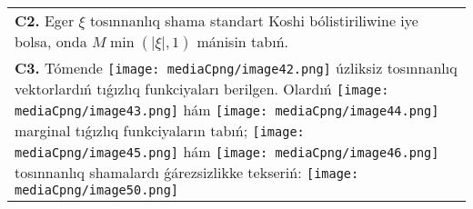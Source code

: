 \documentclass{article}
\begin{document}
\begin{tabular}{m{17cm}}
 \\
\textbf{C2.} Eger \(\xi\) tosınnanlıq shama standart Koshi bólistiriliwine iye bolsa, onda \(M\min\left( |\xi|,1 \right)\) mánisin tabıń.
 \\
\textbf{C3.} Tómende \texttt{[image: mediaCpng/image42.png]} úzliksiz tosınnanlıq vektorlardıń tıǵızlıq funkciyaları berilgen. Olardıń \texttt{[image: mediaCpng/image43.png]} hám \texttt{[image: mediaCpng/image44.png]} marginal tıǵızlıq funkciyaların tabıń; \texttt{[image: mediaCpng/image45.png]} hám \texttt{[image: mediaCpng/image46.png]} tosınnanlıq shamalardı ǵárezsizlikke tekseriń: \texttt{[image: mediaCpng/image50.png]}
 \\

\end{tabular}
\vspace{1cm}
\end{document}
